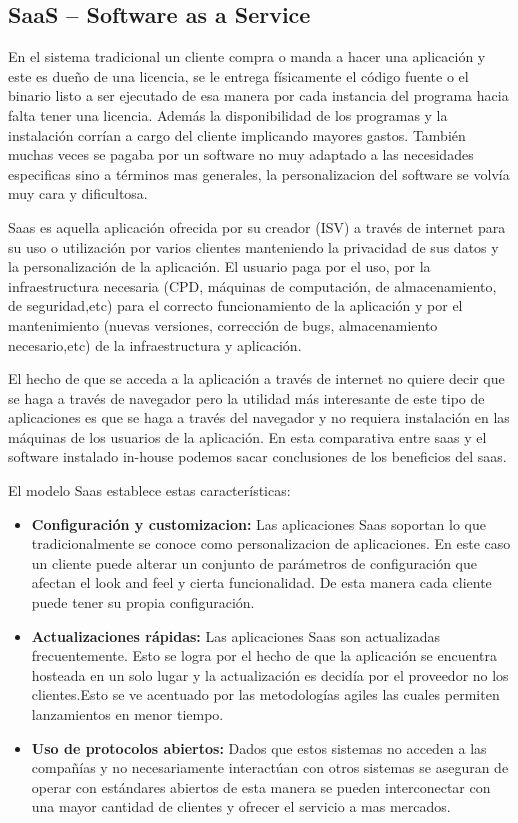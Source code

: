 \documentclass[12pt,a4paper]{article}
\begin{document}
\subsection{SaaS -- Software as a Service}
En el sistema tradicional un cliente compra o manda a hacer una aplicación y 
este es dueño de una licencia, se le entrega físicamente el código fuente o
el binario listo a ser ejecutado de esa manera por cada instancia del 
programa hacia falta tener una licencia. Además la disponibilidad de los 
programas y la instalación corrían a cargo del cliente implicando mayores 
gastos. También muchas veces se pagaba por un software no muy adaptado a las 
necesidades especificas sino a términos mas generales, la personalizacion del 
software se volvía muy cara y dificultosa.\par
Saas es aquella aplicación ofrecida por su creador (ISV) a través de internet 
para su uso o utilización por varios clientes manteniendo la privacidad de 
sus datos y la personalización de la aplicación. El usuario paga por el uso, 
por la infraestructura necesaria (CPD, máquinas de computación, de 
almacenamiento, de seguridad,etc) para el correcto funcionamiento de la 
aplicación y por el mantenimiento (nuevas versiones, corrección de bugs, 
almacenamiento necesario,etc) de la infraestructura y aplicación.\par
El hecho de que se acceda a la aplicación a través de internet no quiere 
decir que se haga a través de navegador pero la utilidad más interesante de 
este tipo de aplicaciones es que se haga a través del navegador y no requiera 
instalación en las máquinas de los usuarios de la aplicación. En esta 
comparativa entre saas y el software instalado in-house  podemos sacar 
conclusiones de los beneficios del saas.\par
El modelo Saas establece estas características:
\begin{itemize}

\item \textbf{Configuración y customizacion: }
Las aplicaciones Saas soportan lo que tradicionalmente se conoce como 
personalizacion de aplicaciones. En este caso un cliente puede alterar un 
conjunto de parámetros de configuración que afectan el look and feel y cierta 
funcionalidad. De esta manera cada cliente puede tener su propia 
configuración.

\item \textbf{Actualizaciones rápidas: }
Las aplicaciones Saas son actualizadas frecuentemente. Esto se logra por el 
hecho de que la aplicación se encuentra hosteada en un solo lugar y la 
actualización es decidía por el proveedor no los clientes.Esto se ve 
acentuado por las metodologías agiles las cuales permiten lanzamientos en 
menor tiempo. 

\item \textbf{Uso de protocolos abiertos: }
Dados que estos sistemas no acceden a las compañías y no necesariamente 
interactúan con otros sistemas se aseguran de operar con estándares abiertos
de esta manera se pueden interconectar con una mayor cantidad de clientes y 
ofrecer el servicio a mas mercados.

\end{itemize}
\end{document}
